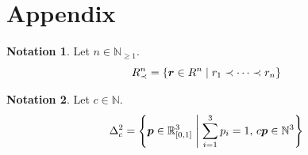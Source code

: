 \documentclass[aspectratio=169,notheorems,10pt]{beamer}
\theoremstyle{definition}
\newtheorem{notation}{Notation}
\newcommand{\N}{\mathbb{N}}
\newcommand{\R}{\mathbb{R}}
\begin{document}
\section{Appendix}

\begin{frame}
\begin{notation}
Let $n\in\N_{\geq 1}$.
$$
	R_{\prec}^{n}
	=
	\mleft\{
		\bm{r}\in R^{n}
		\;\middle|\;
		r_{1}\prec\dots\prec r_{n}
	\mright\}
$$
\end{notation}

\begin{notation}
Let $c\in\N$.
$$
	\Delta_{c}^{2}
	=
	\mleft\{
		\bm{p}\in\R_{[0,1]}^{3}
		\;\middle|\;
		\sum_{i=1}^{3}
		p_{i}
		=
		1
		,\,
		c\bm{p}\in\N^{3}
	\mright\}
$$
\end{notation}
\end{frame}

\begin{frame}[allowframebreaks]


\end{frame}
\end{document}
